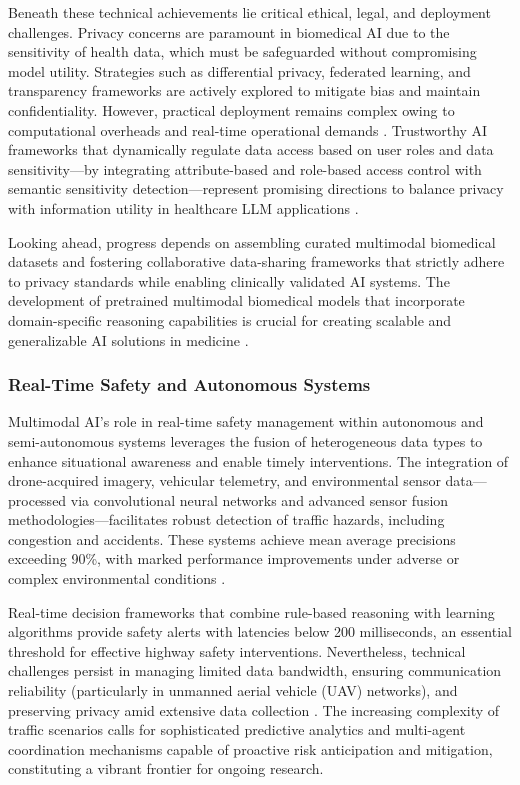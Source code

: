 Beneath these technical achievements lie critical ethical, legal, and deployment challenges. Privacy concerns are paramount in biomedical AI due to the sensitivity of health data, which must be safeguarded without compromising model utility. Strategies such as differential privacy, federated learning, and transparency frameworks are actively explored to mitigate bias and maintain confidentiality. However, practical deployment remains complex owing to computational overheads and real-time operational demands \cite{ref11,ref12}. Trustworthy AI frameworks that dynamically regulate data access based on user roles and data sensitivity—by integrating attribute-based and role-based access control with semantic sensitivity detection—represent promising directions to balance privacy with information utility in healthcare LLM applications \cite{ref11}.

Looking ahead, progress depends on assembling curated multimodal biomedical datasets and fostering collaborative data-sharing frameworks that strictly adhere to privacy standards while enabling clinically validated AI systems. The development of pretrained multimodal biomedical models that incorporate domain-specific reasoning capabilities is crucial for creating scalable and generalizable AI solutions in medicine \cite{ref12}.

\subsubsection{Real-Time Safety and Autonomous Systems}

Multimodal AI’s role in real-time safety management within autonomous and semi-autonomous systems leverages the fusion of heterogeneous data types to enhance situational awareness and enable timely interventions. The integration of drone-acquired imagery, vehicular telemetry, and environmental sensor data—processed via convolutional neural networks and advanced sensor fusion methodologies—facilitates robust detection of traffic hazards, including congestion and accidents. These systems achieve mean average precisions exceeding 90\%, with marked performance improvements under adverse or complex environmental conditions \cite{ref27}.

Real-time decision frameworks that combine rule-based reasoning with learning algorithms provide safety alerts with latencies below 200 milliseconds, an essential threshold for effective highway safety interventions. Nevertheless, technical challenges persist in managing limited data bandwidth, ensuring communication reliability (particularly in unmanned aerial vehicle (UAV) networks), and preserving privacy amid extensive data collection \cite{ref27}. The increasing complexity of traffic scenarios calls for sophisticated predictive analytics and multi-agent coordination mechanisms capable of proactive risk anticipation and mitigation, constituting a vibrant frontier for ongoing research.

